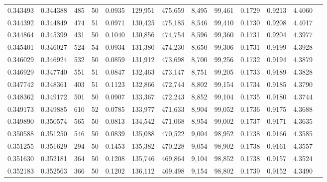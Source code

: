 \begin{tabular}{rrrrrrrrrrrrr}
0.343493 & 0.344388 &   485 &  50 &                                     0.0935 & 129,951 & 475,659 &   8,495 &  99,461 & 0.1729 & 0.9213 & 4.4060 \\
0.344392 & 0.344849 &   474 &  51 &                                     0.0971 & 130,425 & 475,185 &   8,546 &  99,410 & 0.1730 & 0.9208 & 4.4017 \\
0.344864 & 0.345399 &   431 &  50 &                                     0.1040 & 130,856 & 474,754 &   8,596 &  99,360 & 0.1731 & 0.9204 & 4.3977 \\
0.345401 & 0.346027 &   524 &  54 &                                     0.0934 & 131,380 & 474,230 &   8,650 &  99,306 & 0.1731 & 0.9199 & 4.3928 \\
0.346029 & 0.346924 &   532 &  50 &                                     0.0859 & 131,912 & 473,698 &   8,700 &  99,256 & 0.1732 & 0.9194 & 4.3879 \\
0.346929 & 0.347740 &   551 &  51 &                                     0.0847 & 132,463 & 473,147 &   8,751 &  99,205 & 0.1733 & 0.9189 & 4.3828 \\
0.347742 & 0.348361 &   403 &  51 &                                     0.1123 & 132,866 & 472,744 &   8,802 &  99,154 & 0.1734 & 0.9185 & 4.3790 \\
0.348362 & 0.349172 &   501 &  50 &                                     0.0907 & 133,367 & 472,243 &   8,852 &  99,104 & 0.1735 & 0.9180 & 4.3744 \\
0.349173 & 0.349885 &   610 &  52 &                                     0.0785 & 133,977 & 471,633 &   8,904 &  99,052 & 0.1736 & 0.9175 & 4.3688 \\
0.349890 & 0.350574 &   565 &  50 &                                     0.0813 & 134,542 & 471,068 &   8,954 &  99,002 & 0.1737 & 0.9171 & 4.3635 \\
0.350588 & 0.351250 &   546 &  50 &                                     0.0839 & 135,088 & 470,522 &   9,004 &  98,952 & 0.1738 & 0.9166 & 4.3585 \\
0.351255 & 0.351629 &   294 &  50 &                                     0.1453 & 135,382 & 470,228 &   9,054 &  98,902 & 0.1738 & 0.9161 & 4.3557 \\
0.351630 & 0.352181 &   364 &  50 &                                     0.1208 & 135,746 & 469,864 &   9,104 &  98,852 & 0.1738 & 0.9157 & 4.3524 \\
0.352183 & 0.352563 &   366 &  50 &                                     0.1202 & 136,112 & 469,498 &   9,154 &  98,802 & 0.1739 & 0.9152 & 4.3490 \\

\end{tabular}
